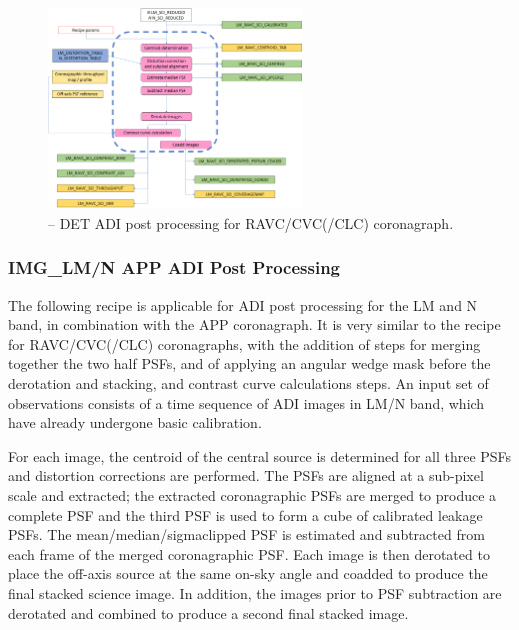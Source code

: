\begin{figure}[hb]
  \centering
  \includegraphics[width=0.6\textwidth]{./figures/metis_lm_adi_ravc}
  \caption[Recipe: ]{ -- DET ADI post processing for RAVC/CVC(/CLC) coronagraph.
    }
  \label{fig:metis_det_adi_ravc}
\end{figure}




\subsubsection{IMG\_LM/N APP ADI Post Processing}
\label{sssec:adi_img_app}


The following recipe is applicable for ADI post processing for the LM
and N band, in combination with the APP coronagraph. It is very
similar to the recipe for RAVC/CVC(/CLC) coronagraphs, with the
addition of steps for merging together the two half PSFs, and of
applying an angular wedge mask before the derotation and stacking, and
contrast curve calculations steps. An input set of observations
consists of a time sequence of ADI images in LM/N band, which have
already undergone basic calibration.

For each image, the centroid of the central source is determined for
all three PSFs and distortion corrections are performed. The PSFs are
aligned at a sub-pixel scale and extracted; the extracted
coronagraphic PSFs are merged to produce a complete PSF and the third
PSF is used to form a cube of calibrated leakage PSFs.  The
mean/median/sigmaclipped PSF is estimated and subtracted from each
frame of the merged coronagraphic PSF. Each image is then derotated to
place the off-axis source at the same on-sky angle and coadded to
produce the final stacked science image. In addition, the images prior
to PSF subtraction are derotated and combined to produce a second
final stacked image.

